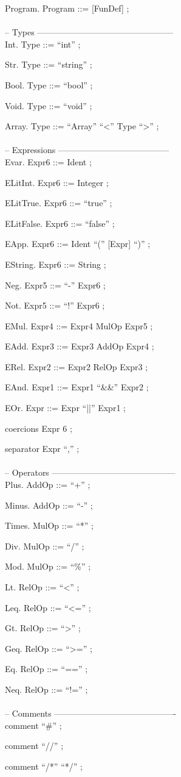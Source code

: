 \documentclass[a4paper]{article}
\begin{document}
Program. Program ::= [FunDef] ;
\\\\
\noindent
-- Types ------------------------------------------------\\

Int. Type ::= ``int'' ;

Str. Type ::= ``string'' ;

Bool. Type ::= ``bool'' ;

Void. Type ::= ``void'' ;

Array. Type ::= ``Array'' ``<'' Type ``>'' ;
\\\\
\noindent
-- Expressions ---------------------------------------\\

Evar. Expr6 ::= Ident ;

ELitInt. Expr6 ::= Integer ;

ELitTrue. Expr6 ::= ``true'' ;

ELitFalse. Expr6 ::= ``false'' ;

EApp. Expr6 ::= Ident ``('' [Expr] ``)'' ;

EString. Expr6 ::= String ;

Neg. Expr5 ::= ``-'' Expr6 ;

Not. Expr5 ::= ``!'' Expr6 ;

EMul. Expr4 ::= Expr4 MulOp Expr5 ;

EAdd. Expr3 ::= Expr3 AddOp Expr4 ;

ERel. Expr2 ::= Expr2 RelOp Expr3 ;

EAnd. Expr1 ::= Expr1 ``\&\&'' Expr2 ;

EOr. Expr ::= Expr ``||'' Expr1 ;

coercions Expr 6 ;

separator Expr ``,'' ;
\\\\
\noindent
-- Operators --------------------------------------------\\

Plus. AddOp ::= ``+'' ;

Minus. AddOp ::= ``-'' ;

Times. MulOp ::= ``*'' ;

Div. MulOp ::= ``/'' ;

Mod. MulOp ::= ``\%'' ;

Lt. RelOp ::= ``<'' ;

Leq. RelOp ::= ``<='' ;

Gt. RelOp ::= ``>'' ;

Geq. RelOp ::= ``>='' ;

Eq. RelOp ::= ``=='' ;

Neq. RelOp ::= ``!='' ;
\\\\
\noindent
-- Comments -------------------------------------------\\

comment ``\#'' ;

comment ``//'' ;

comment ``/*'' ``*/'' ;
\end{document}
